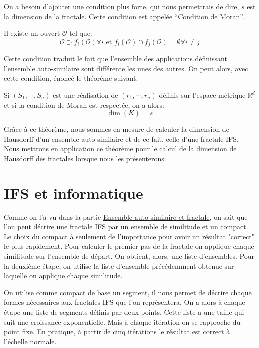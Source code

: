 \documentclass[a4paper, 12pt]{report}
\begin{document}
			On a besoin d'ajouter une condition plus forte, qui nous permettrais de dire, $s$ est la dimension de la fractale. Cette condition est appelée ``Condition de Moran''.
			\begin{definition}
				Il existe un ouvert $\mathscr{O}$ tel que:
				\begin{equation}
					\mathscr{O}\supset f_i(\mathscr{O})\forall i \textrm{ et } f_i(\mathscr{O})\cap f_j(\mathscr{O})=\emptyset \forall i\neq j
				\end{equation}
			\end{definition}
			Cette condition traduit le fait que l'ensemble des applications définissant l'ensemble auto-similaire sont différente les unes des autres.
			On peut alors, avec cette condition, énoncé le théorème suivant:
			\begin{theorem}
				\label{thmDim}
				Si $(S_1,\cdots,S_n)$ est une réalisation de $(r_1,\cdots,r_n)$ définis sur l'espace métrique $\mathds{R}^d$ et si la condition de Moran est respectée, on a alors:
				\begin{equation*}
					\dim(K)=s
				\end{equation*}
			\end{theorem}
			\hspace{0.7 cm} Grâce à ce théorème, nous sommes en mesure de calculer la dimension de Hausdorff d'un ensemble auto-similaire et de ce fait, celle d'une fractale IFS. Nous mettrons en application ce théorème pour le calcul de la dimension de Hausdorff des fractales lorsque nous les présenterons.
			

			
	
	\chapter{IFS et informatique}
			
			Comme on l'a vu dans la partie \hyperref[FracEns]{Ensemble auto-similaire et fractale}, on sait que l'on peut décrire une fractale IFS par un ensemble de similitude et un compact. 
			Le choix du compact à seulement de l'importance pour avoir un résultat "correct" le plus rapidement. Pour calculer le premier pas de la fractale on applique chaque similitude sur l'ensemble de départ. On obtient, alors, une liste d'ensembles. Pour la deuxième étape, on utilise la liste d'ensemble précédemment obtenue sur laquelle on applique chaque similitude.
			
			
			\vspace{.2 cm}\hspace{.7 cm}
			On utilise comme compact de base un segment, il nous permet de décrire chaque formes nécessaires aux fractales IFS que l'on représentera. On a alors à chaque étape une liste de segments définis par deux points. Cette liste a une taille qui suit une croissance exponentielle. Mais à chaque itération on se rapproche du point fixe. En pratique, à partir de cinq itérations le résultat est correct à l'échelle normale.
			
\end{document}
